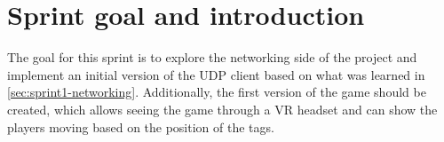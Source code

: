 \section{Sprint goal and introduction}\label{sec:sprint1-goals}
The goal for this sprint is to explore the networking side of the project and implement an initial version of the UDP client based on what was learned in \autoref{sec:sprint1-networking}.
Additionally, the first version of the game should be created, which allows seeing the game through a VR headset and can show the players moving based on the position of the tags.
